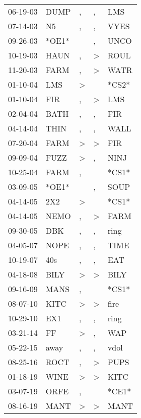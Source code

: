 \begin{supertabular}{lllll}
 06-19-03 &   DUMP &             , &                , &    LMS \\
 07-14-03 &     N5 &             , &                , &   VYES \\
 09-26-03 &  *OE1* &               &                , &   UNCO \\
 10-19-03 &   HAUN &             , &     \textgreater &   ROUL \\
 11-20-03 &   FARM &             , &     \textgreater &   WATR \\
 01-10-04 &    LMS &  \textgreater &                  &  *CS2* \\
 01-10-04 &    FIR &             , &     \textgreater &    LMS \\
 02-04-04 &   BATH &             , &                , &    FIR \\
 04-14-04 &   THIN &             , &                , &   WALL \\
 07-20-04 &   FARM &  \textgreater &     \textgreater &    FIR \\
 09-09-04 &   FUZZ &  \textgreater &                , &   NINJ \\
 10-25-04 &   FARM &             , &                  &  *CS1* \\
 03-09-05 &  *OE1* &               &                , &   SOUP \\
 04-14-05 &    2X2 &  \textgreater &                  &  *CS1* \\
 04-14-05 &   NEMO &             , &     \textgreater &   FARM \\
 09-30-05 &    DBK &             , &                , &   ring \\
 04-05-07 &   NOPE &             , &                , &   TIME \\
 10-19-07 &    40s &             , &                , &    EAT \\
 04-18-08 &   BILY &  \textgreater &     \textgreater &   BILY \\
 09-16-09 &   MANS &             , &                  &  *CS1* \\
 08-07-10 &   KITC &  \textgreater &     \textgreater &   fire \\
 10-29-10 &    EX1 &             , &                , &   ring \\
 03-21-14 &     FF &  \textgreater &                , &    WAP \\
 05-22-15 &   away &             , &                , &   vdol \\
 08-25-16 &   ROCT &             , &     \textgreater &   PUPS \\
 01-18-19 &   WINE &  \textgreater &     \textgreater &   KITC \\
 03-07-19 &   ORFE &             , &                  &  *CE1* \\
 08-16-19 &   MANT &  \textgreater &     \textgreater &   MANT \\
\end{supertabular}
